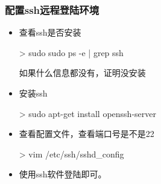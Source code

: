 \subsubsection{配置ssh远程登陆环境}
\begin{itemize}
\item 查看ssh是否安装
\begin{commandbox}
 > sudo sudo ps -e | grep ssh
\end{commandbox}
如果什么信息都没有，证明没安装

\item 安装ssh
\begin{commandbox}
 > sudo apt-get install openssh-server
\end{commandbox}

\item 查看配置文件，查看端口号是不是22
\begin{commandbox}
 > vim /etc/ssh/sshd_config
\end{commandbox}

\item 使用ssh软件登陆即可。

\end{itemize}

